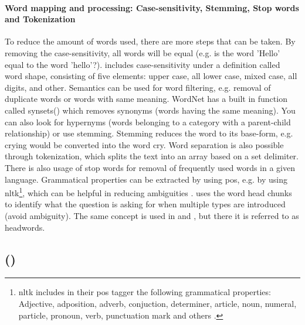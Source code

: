 \paragraph{Word mapping and processing: Case-sensitivity, Stemming, Stop words and Tokenization}
\label{sec:word_mapping_processing}
To reduce the amount of words used, there are more steps that can be taken. 
By removing the case-sensitivity, all words will be equal (e.g. is the word 'Hello' equal to the word 'hello'?).
\cite{Huang2008} includes case-sensitivity under a definition called word shape, consisting of five elements: upper case, all lower case, mixed case, all digits, and other.
\vspace{0.5em}\newline
Semantics can be used for word filtering, e.g. removal of duplicate words or words with same meaning. 
WordNet has a built in function called synsets() which removes synonyms (words having the same meaning). 
You can also look for hypernyms (words belonging to a category with a parent-child relationship) or use stemming.
Stemming reduces the word to its base-form, e.g. crying would be converted into the word cry.
Word separation is also possible through tokenization, which splits the text into an array based on a set delimiter.
There is also usage of stop words for removal of frequently used words in a given language.
\vspace{0.5em}\newline
Grammatical properties can be extracted by using \gls{pos}, e.g. by using \gls{nltk}\footnote{
	\gls{nltk} includes in their \gls{pos} tagger the following grammatical properties:
	Adjective, adposition, adverb, conjuction, determiner, article, noun, numeral, particle, pronoun, verb, 
	punctuation mark and others	 \cite[See Section 2.3]{StevenBird2015}.
}, which can be helpful in reducing ambiguities \cite{Bloehdorn2004}.
\textcite{Li} uses the word head chunks to identify what the question is asking for when multiple types are introduced (avoid ambiguity). 
The same concept is used in \cite{Huang2008} and \cite{Loni2011}, but there it is referred to as headwords.


\subsection[Question-Answering]{ ()}
\label{sec:question_answering}


